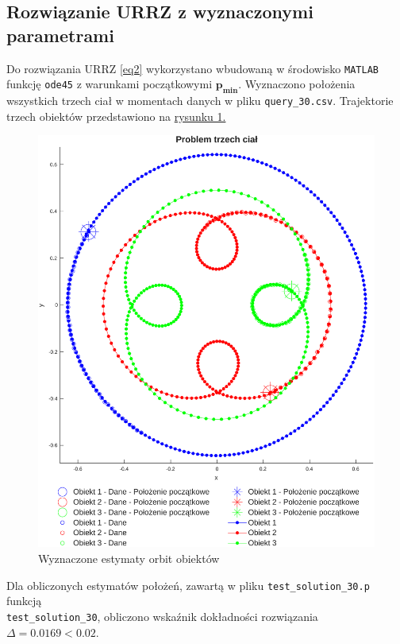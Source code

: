 \documentclass[a4paper, 12pt, twoside, openany]{article}
\begin{document}
	\subsection{Rozwiązanie URRZ z wyznaczonymi parametrami}
	Do rozwiązania URRZ \eqref{eq2} wykorzystano wbudowaną w środowisko \texttt{MATLAB} funkcję \texttt{ode45} z warunkami początkowymi $\mathbf{p_{min}}$. Wyznaczono położenia wszystkich trzech ciał w momentach danych w pliku \texttt{query\_30.csv}. Trajektorie trzech obiektów przedstawiono na \hyperref[fig:rys1]{rysunku 1.} \\

    \begin{figure}[H]
	\centering
	\includegraphics[scale=0.8]{orbity2.pdf}
	\caption{\normalsize Wyznaczone estymaty orbit obiektów}
	\label{fig:rys1} %
	\end{figure}

	\noindent
	Dla obliczonych estymatów położeń, zawartą w pliku \texttt{test\_solution\_30.p} funkcją\\ \texttt{test\_solution\_30}, obliczono wskaźnik dokładności rozwiązania $\Delta = 0.0169 < 0.02$.
	
\end{document}
